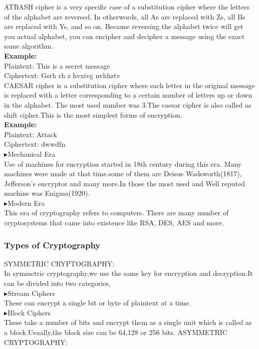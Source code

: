 \documentclass[11pt]{article}
\begin{document}
     
        ATBASH cipher is a very specific case of a substitution cipher where the letters of the alphabet are reversed. 
In otherwords, all As are replaced with Zs, all Bs are replaced with Ys, and so on.
Because reversing the alphabet twice will get you actual alphabet, you can encipher and decipher a message using the exact same algorithm.\\
{\bf Example:}\\
Plaintext: This is a secret message\\
Ciphertext: Gsrh rh z hvxivg nvhhztv\\
        
        CAESAR cipher is a substitution cipher where each letter in the original message is replaced with a letter corresponding to a certain number of letters up or down in the alphabet.
 The most used number was 3.The caesar cipher is also called as shift cipher.This is the most simplest forms of encryption.\\
 {\bf Example:}\\
 Plaintext: Attack\\
 Ciphertext: dwwdfn\\
 
$\blacktriangleright${Mechanical Era}\\
 
        \quad Use of machines for encryption started in 18th century during this era. 
Many machines were made at that time.some of them are Deisus Wadsworth(1817), Jefferson’s encryptor and many more.In those the most used and Well reputed machine was Enigma(1920).\\

$\blacktriangleright${Modern Era}\\
         
        \quad This era of cryptography refers to computers. There are many number of cryptosystems that came into existence like RSA, DES, AES and more.\\

\cite{Intro}



\subsubsection{Types of Cryptography}

 SYMMETRIC CRYPTOGRAPHY:\\
 
 In symmetric cryptography,we use the same key for encryption and decryption.It can be divided into two categories,\\
$\blacktriangleright$Stream Ciphers\\
       These can encrypt a single bit or byte of plaintext at a time.\\
$\blacktriangleright$Block Ciphers\\
       These take a number of bits and encrypt them as a single unit which is called as a block.Usually,the block size can be 64,128 or 256 bits.\newline
\newline
ASYMMETRIC CRYPTOGRAPHY:\\
\end{document}
